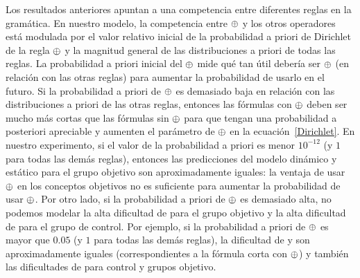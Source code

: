 Los resultados anteriores apuntan a una competencia entre diferentes reglas en la gramática. En nuestro modelo, la competencia entre $ \oplus $ y los otros operadores está modulada por el valor relativo inicial de la probabilidad a priori de Dirichlet de la regla $ \oplus $ y la magnitud general de las distribuciones a priori de todas las reglas. La probabilidad a priori inicial del $ \oplus $ mide qué tan útil debería ser $ \oplus $ (en relación con las otras reglas) para aumentar la probabilidad de usarlo en el futuro. Si la probabilidad a priori de $ \oplus $ es demasiado baja en relación con las distribuciones a priori de las otras reglas, entonces las fórmulas con $ \oplus $ deben ser mucho más cortas que las fórmulas sin $ \oplus $ para que tengan una probabilidad a posteriori apreciable y aumenten el parámetro de $ \oplus $ en la ecuación~\eqref{Dirichlet}. En nuestro experimento, si el valor de la probabilidad a priori es menor $ 10^{- 12} $ (y $1$ para todas las demás reglas), entonces las predicciones del modelo dinámico y estático para el grupo objetivo son aproximadamente iguales: la ventaja de usar $ \oplus $ en los conceptos objetivos no es suficiente para aumentar la probabilidad de usar $ \oplus $. Por otro lado, si la probabilidad a priori de $ \oplus $ es demasiado alta, no podemos modelar la alta dificultad de \targetb para el grupo objetivo y la alta dificultad de \testa para el grupo de control. Por ejemplo, si la probabilidad a priori de $ \oplus $ es mayor que $0.05$ (y $1$ para todas las demás reglas), la dificultad de \targetb y \targetd son aproximadamente iguales (correspondientes a la fórmula corta con $ \oplus $) y también las dificultades de \testa para control y grupos objetivo. 

